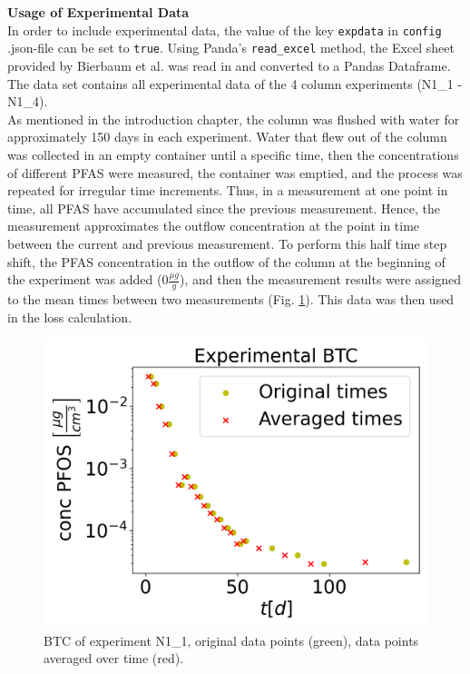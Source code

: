 \\
\\
\textbf{Usage of Experimental Data}
\\
In order to include experimental data, the value of the key \texttt{expdata} in \texttt{config} .json-file can be set to \texttt{true}. Using Panda's \texttt{read\_excel} method, the Excel sheet provided by Bierbaum et al. \cite{Bierbaum2022Mar} was read in and converted to a Pandas Dataframe. The data set contains all experimental data of the 4 column experiments (N1\_1 - N1\_4).\\
As mentioned in the introduction chapter, the column was flushed with water for approximately 150 days in each experiment. Water that flew out of the column was collected in an empty container until a specific time, then the concentrations of different PFAS were measured, the container was emptied, and the process was repeated for irregular time increments. Thus, in a measurement at one point in time, all PFAS have accumulated since the previous measurement. Hence, the measurement approximates the outflow concentration at the point in time between the current and previous measurement. To perform this half time step shift, the PFAS concentration in the outflow of the column at the beginning of the experiment was added ($0\frac{\mu g}{g}$), and then the measurement results were assigned to the mean times between two measurements (Fig. \ref{fig:exp_btc}). This data was then used in the loss calculation.
\begin{figure}
	\centering
	\includegraphics[scale=0.6]{images/exp_btc.png}
\caption[Experimental BTC]{BTC of experiment N1\_1, original data points (green), data points averaged over time (red).}
\label{fig:exp_btc}
\end{figure}
